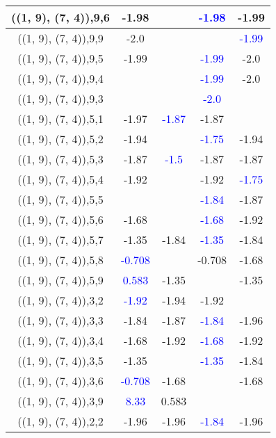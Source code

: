 \documentclass{article}
\begin{document}
\begin{center}
\begin{longtable}{|c|c|c|c|c|}
        	((1, 9), (7, 4)),9,6&-1.98&& \textcolor{blue}{-1.98}&-1.99\\
        	\hline
        	((1, 9), (7, 4)),9,9&-2.0&&& \textcolor{blue}{-1.99}\\
        	\hline
        	((1, 9), (7, 4)),9,5&-1.99&& \textcolor{blue}{-1.99}&-2.0\\
        	\hline
        	((1, 9), (7, 4)),9,4&&& \textcolor{blue}{-1.99}&-2.0\\
        	\hline
        	((1, 9), (7, 4)),9,3&&& \textcolor{blue}{-2.0}&\\
        	\hline
        	((1, 9), (7, 4)),5,1&-1.97& \textcolor{blue}{-1.87}&-1.87&\\
        	\hline
        	((1, 9), (7, 4)),5,2&-1.94&& \textcolor{blue}{-1.75}&-1.94\\
        	\hline
        	((1, 9), (7, 4)),5,3&-1.87& \textcolor{blue}{-1.5}&-1.87&-1.87\\
        	\hline
        	((1, 9), (7, 4)),5,4&-1.92&&-1.92& \textcolor{blue}{-1.75}\\
        	\hline
        	((1, 9), (7, 4)),5,5&&& \textcolor{blue}{-1.84}&-1.87\\
        	\hline
        	((1, 9), (7, 4)),5,6&-1.68&& \textcolor{blue}{-1.68}&-1.92\\
        	\hline
        	((1, 9), (7, 4)),5,7&-1.35&-1.84& \textcolor{blue}{-1.35}&-1.84\\
        	\hline
        	((1, 9), (7, 4)),5,8& \textcolor{blue}{-0.708}&&-0.708&-1.68\\
        	\hline
        	((1, 9), (7, 4)),5,9& \textcolor{blue}{0.583}&-1.35&&-1.35\\
        	\hline
        	((1, 9), (7, 4)),3,2& \textcolor{blue}{-1.92}&-1.94&-1.92&\\
        	\hline
        	((1, 9), (7, 4)),3,3&-1.84&-1.87& \textcolor{blue}{-1.84}&-1.96\\
        	\hline
        	((1, 9), (7, 4)),3,4&-1.68&-1.92& \textcolor{blue}{-1.68}&-1.92\\
        	\hline
        	((1, 9), (7, 4)),3,5&-1.35&& \textcolor{blue}{-1.35}&-1.84\\
        	\hline
        	((1, 9), (7, 4)),3,6& \textcolor{blue}{-0.708}&-1.68&&-1.68\\
        	\hline
        	((1, 9), (7, 4)),3,9& \textcolor{blue}{8.33}&0.583&&\\
        	\hline
        	((1, 9), (7, 4)),2,2&-1.96&-1.96& \textcolor{blue}{-1.84}&-1.96\\

\end{longtable}
\end{center}
\end{document}

